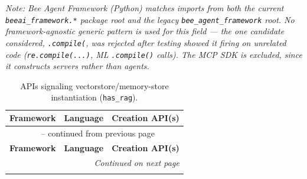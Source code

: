 \textit{Note: Bee Agent Framework (Python) matches imports from both the current \texttt{beeai\_framework.*} package root and the legacy \texttt{bee\_agent\_framework} root. No framework-agnostic generic pattern is used for this field --- the one candidate considered, \texttt{.compile(}, was rejected after testing showed it firing on unrelated code (\texttt{re.compile(...)}, ML \texttt{.compile()} calls). The MCP SDK is excluded, since it constructs servers rather than agents.}


{\footnotesize
\renewcommand{\arraystretch}{0.9}
\begin{longtable}{@{}p{}p{}p{}@{}}
\caption{APIs signaling vectorstore/memory-store instantiation (\texttt{has\_rag}).}
\label{tab:rag-creation-apis} \\
\toprule
\textbf{Framework} & \textbf{Language} & \textbf{Creation API(s)} \\
\midrule
\endfirsthead
\multicolumn{3}{c}{\tablename\ \thetable{} -- continued from previous page} \\
\toprule
\textbf{Framework} & \textbf{Language} & \textbf{Creation API(s)} \\
\midrule
\endhead
\midrule
\multicolumn{3}{r}{\textit{Continued on next page}} \\
\endfoot
\bottomrule
\endlastfoot


\end{longtable}}
